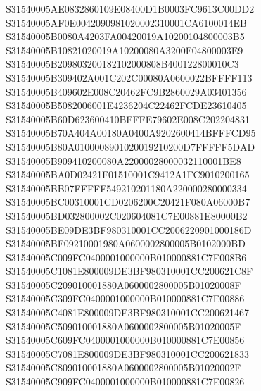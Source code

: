 \documentclass[12pt,a4paper]{article}
\begin{document}
\begin{framed}
{S31540005AE0832860109E08400D1B0003FC9613C00DD2\newline
S31540005AF0E0042090981020002310001CA6100014EB\newline
S31540005B0080A4203FA00420019A10200104800003B5\newline
S31540005B10821020019A10200080A3200F04800003E9\newline
S31540005B209803200182102000808B400122800010C3\newline
S31540005B309402A001C202C00080A0600022BFFFF113\newline
S31540005B409602E008C20462FC9B2860029A03401356\newline
S31540005B5082006001E4236204C22462FCDE23610405\newline
S31540005B60D623600410BFFFE79602E008C202204831\newline
S31540005B70A404A00180A0400A9202600414BFFFCD95\newline
S31540005B80A0100008901020019210200D7FFFFF5DAD\newline
S31540005B909410200080A22000028000032110001BE8\newline
S31540005BA0D02421F01510001C9412A1FC9010200165\newline
S31540005BB07FFFFF549210201180A220000280000334\newline
S31540005BC00310001CD0206200C20421F080A06000B7\newline
S31540005BD032800002C020604081C7E00881E80000B2\newline
S31540005BE09DE3BF980310001CC2006220901000186D\newline
S31540005BF09210001980A0600002800005B0102000BD\newline
S31540005C009FC0400001000000B010000881C7E008B6\newline
S31540005C1081E800009DE3BF980310001CC200621C8F\newline
S31540005C209010001880A0600002800005B01020008F\newline
S31540005C309FC0400001000000B010000881C7E00886\newline
S31540005C4081E800009DE3BF980310001CC200621467\newline
S31540005C509010001880A0600002800005B01020005F\newline
S31540005C609FC0400001000000B010000881C7E00856\newline
S31540005C7081E800009DE3BF980310001CC200621833\newline
S31540005C809010001880A0600002800005B01020002F\newline
S31540005C909FC0400001000000B010000881C7E00826\newline
}
\end{framed}
\end{document}
